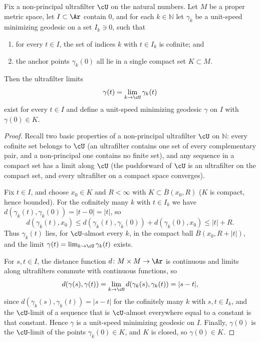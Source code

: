 \begin{lemma}
\label{lem:ultrafilter-limit-minimizing}
\leanok
{}
Fix a non-principal ultrafilter $\cU$ on the natural numbers. Let $M$
be a proper metric space, let $I\subset\Ar$ contain $0$, and for
each $k\in\mathbb{N}$ let $\gamma_k$ be a unit-speed minimizing
geodesic on a set $I_k\ni 0$, such that
\begin{enumerate}
\item for every $t\in I$, the set of indices $k$ with $t\in I_k$ is
cofinite; and
\item the anchor points $\gamma_k(0)$ all lie in a single compact
set $K\subset M$.
\end{enumerate}
Then the ultrafilter limits
$$\gamma(t)=\lim_{k\rightarrow\cU}\gamma_k(t)$$
exist for every $t\in I$ and define a unit-speed minimizing geodesic
$\gamma$ on $I$ with $\gamma(0)\in K$.
\end{lemma}

\begin{proof}
\leanok
{}
Recall two basic properties of a non-principal ultrafilter $\cU$ on
$\mathbb{N}$: every cofinite set belongs to $\cU$ (an ultrafilter
contains one set of every complementary pair, and a non-principal
one contains no finite set), and any sequence in a compact set has a
limit along $\cU$ (the pushforward of $\cU$ is an ultrafilter on the
compact set, and every ultrafilter on a compact space converges).

Fix $t\in I$, and choose $x_0\in K$ and $R<\infty$ with
$K\subset\overline{B}(x_0,R)$ ($K$ is compact, hence bounded). For
the cofinitely many $k$ with $t\in I_k$ we have
$d(\gamma_k(t),\gamma_k(0))=|t-0|=|t|$, so
$$d(\gamma_k(t),x_0)\le
d(\gamma_k(t),\gamma_k(0))+d(\gamma_k(0),x_0)\le|t|+R.$$
Thus $\gamma_k(t)$ lies, for $\cU$-almost every $k$, in the compact
ball $\overline{B}(x_0,R+|t|)$, and the limit
$\gamma(t)=\lim_{k\rightarrow\cU}\gamma_k(t)$ exists.

For $s,t\in I$, the distance function $d\colon M\times M\to\Ar$ is
continuous and limits along ultrafilters commute with continuous
functions, so
$$d(\gamma(s),\gamma(t))
=\lim_{k\rightarrow\cU}d(\gamma_k(s),\gamma_k(t))=|s-t|,$$
since $d(\gamma_k(s),\gamma_k(t))=|s-t|$ for the cofinitely many $k$
with $s,t\in I_k$, and the $\cU$-limit of a sequence that is
$\cU$-almost everywhere equal to a constant is that constant. Hence
$\gamma$ is a unit-speed minimizing geodesic on $I$. Finally,
$\gamma(0)$ is the $\cU$-limit of the points $\gamma_k(0)\in K$, and
$K$ is closed, so $\gamma(0)\in K$.
\end{proof}

